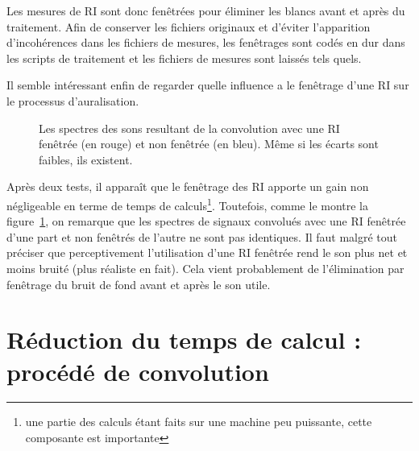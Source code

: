 Les mesures de RI sont donc fenêtrées pour éliminer les blancs avant et après du traitement. Afin de conserver les
fichiers originaux et d'éviter l'apparition d'incohérences dans les fichiers de mesures, les fenêtrages sont codés en
dur dans les scripts de traitement et les fichiers de mesures sont laissés tels quels.

Il semble intéressant enfin de regarder quelle influence a le fenêtrage d'une RI sur le processus d'auralisation.

\begin{figure}[h!]
\caption{\label{spectres_recoupage}Les spectres des sons resultant de la convolution avec une RI fenêtrée (en rouge) et
non fenêtrée (en bleu). Même si les écarts sont faibles, ils existent.}
\end{figure}

Après deux tests, il apparaît que le fenêtrage des RI apporte un gain non négligeable en terme de temps de
calculs\footnote{une partie des calculs étant faits sur une machine peu puissante, cette composante est importante}.
Toutefois, comme le montre la figure~\ref{spectres_recoupage}, on remarque que les spectres de signaux convolués avec
une RI fenêtrée d'une part et non fenêtrés de l'autre ne sont pas identiques. Il faut malgré tout préciser que
perceptivement l'utilisation d'une RI fenêtrée rend le son plus net et moins bruité (plus réaliste en fait). Cela vient
probablement de l'élimination par fenêtrage du bruit de fond avant et après le son utile.

\section{Réduction du temps de calcul : procédé de convolution} %
\label{acceleration_des_calculs}

